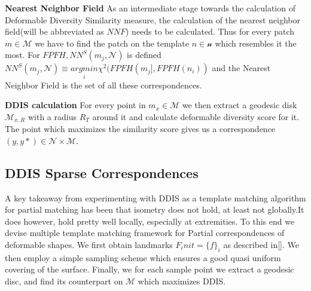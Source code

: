 \documentclass[10pt,twocolumn,letterpaper]{article}
\begin{document}
\textbf{Nearest Neighbor Field}
As an intermediate stage towards the calculation of Deformable Diversity Similarity measure, the calculation of the nearest neighbor field(will be abbreviated as $NNF$) needs to be calculated. Thus for every patch $m\in \mathcal{M}$ we have to find the patch on the template $n\in\mathcal{n}$ which resembles it the most. For $FPFH, NN^S(m_j,\mathcal{N})$ is defined $NN^S (m_j,\mathcal{N}) \equiv \underset{i}{argmin}\chi^2(FPFH(m_j],FPFH(n_i))$ and the Nearest Neighbor Field is the set of all these correspondences.

\textbf{DDIS calculation}
For every point in $m_x\in\mathcal{M}$ we then extract a geodesic disk $\mathcal{M}_{x,R}$ with a radius $R_T$ around it and calculate deformable diversity score for it. The point which maximizes the similarity score gives us a correspondence $(y,y*)\in \mathcal{N}\times\mathcal{M}$.

\subsection{DDIS Sparse Correspondences}
A key takeaway from experimenting with DDIS as a template matching algorithm for partial matching has been that isometry does not hold, at least not globally.It does however, hold pretty well locally, especially at extremities. To this end we devise  multiple template matching framework for Partial correspondences of deformable shapes. We first obtain landmarks $F_init=\{f\}_i$ as described in[]. 
We then employ a simple sampling scheme which ensures a good quasi uniform covering of the surface.
Finally, we for each sample point we extract a geodesic disc, and find its counterpart on $\mathcal{M}$ which maximizes DDIS. 
\end{document}
